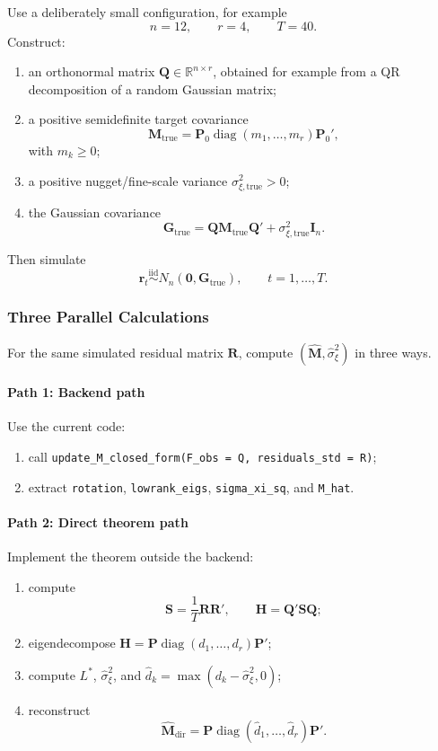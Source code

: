 \documentclass[11pt]{article}
\newcommand{\bQ}{\mathbf{Q}}
\newcommand{\bG}{\mathbf{G}}
\newcommand{\bM}{\mathbf{M}}
\newcommand{\bS}{\mathbf{S}}
\newcommand{\bH}{\mathbf{H}}
\newcommand{\bP}{\mathbf{P}}
\newcommand{\br}{\mathbf{r}}
\newcommand{\bzero}{\mathbf{0}}
\newcommand{\diag}{\operatorname{diag}}
\newcommand{\I}{\mathbf{I}}
\begin{document}
Use a deliberately small configuration, for example
\[
n = 12, \qquad r = 4, \qquad T = 40.
\]
Construct:

\begin{enumerate}[label=\arabic*.]
\item an orthonormal matrix \(\bQ \in \mathbb{R}^{n \times r}\), obtained for
example from a QR decomposition of a random Gaussian matrix;
\item a positive semidefinite target covariance
\[
\bM_{\mathrm{true}} = \bP_0 \diag(m_1,\ldots,m_r)\bP_0',
\]
with \(m_k \ge 0\);
\item a positive nugget/fine-scale variance \(\sigma_{\xi,\mathrm{true}}^2 > 0\);
\item the Gaussian covariance
\[
\bG_{\mathrm{true}} = \bQ \bM_{\mathrm{true}} \bQ' +
\sigma_{\xi,\mathrm{true}}^2 \I_n.
\]
\end{enumerate}

Then simulate
\[
\br_t \overset{\mathrm{iid}}{\sim} N_n(\bzero, \bG_{\mathrm{true}}),
\qquad
t=1,\ldots,T.
\]

\subsubsection{Three Parallel Calculations}

For the same simulated residual matrix \(\mathbf{R}\), compute
\((\widehat{\bM}, \widehat{\sigma}_\xi^2)\) in three ways.

\paragraph{Path 1: Backend path}
Use the current code:
\begin{enumerate}[label=\arabic*.]
\item call \texttt{update\_M\_closed\_form(F\_obs = Q, residuals\_std = R)};
\item extract \texttt{rotation}, \texttt{lowrank\_eigs},
\texttt{sigma\_xi\_sq}, and \texttt{M\_hat}.
\end{enumerate}

\paragraph{Path 2: Direct theorem path}
Implement the theorem outside the backend:
\begin{enumerate}[label=\arabic*.]
\item compute
\[
\bS = \frac{1}{T}\mathbf{R}\mathbf{R}', \qquad
\bH = \bQ'\bS\bQ;
\]
\item eigendecompose \(\bH = \bP \diag(d_1,\ldots,d_r)\bP'\);
\item compute \(L^*\), \(\widehat{\sigma}_\xi^2\), and
\(\widehat d_k = \max(d_k - \widehat{\sigma}_\xi^2, 0)\);
\item reconstruct
\[
\widehat{\bM}_{\mathrm{dir}} =
\bP \diag(\widehat d_1,\ldots,\widehat d_r)\bP'.
\]
\end{enumerate}
\end{document}
